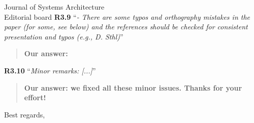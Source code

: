 \documentclass[a4paper,10pt]{letter}
\begin{document}
\begin{letter}{Journal of Systems Architecture\\
    Editorial board}
\textbf{R3.9} ``\textit{- There are some typos and orthography mistakes in the paper (for some, see below) and the references should be checked for consistent presentation and typos (e.g., D. Sthl)}''
\begin{quote}
\textbf{Our answer: }
\end{quote}

\textbf{R3.10} ``\textit{Minor remarks: [...]}''
\begin{quote}
\textbf{Our answer: we fixed all these minor issues. Thanks for your effort!}
\end{quote}

\hrulefill

\vfill

\closing{Best regards,}




\end{letter}
\end{document}
